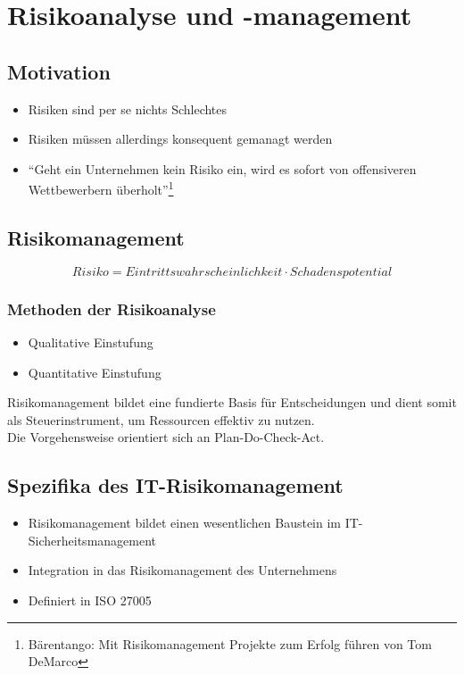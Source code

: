 \section{Risikoanalyse und -management}

\subsection{Motivation}
\begin{itemize}
	\item Risiken sind per se nichts Schlechtes
	\item Risiken müssen allerdings konsequent gemanagt werden
	\item "`Geht ein Unternehmen kein Risiko ein, wird es sofort von offensiveren Wettbewerbern überholt"'\footnote{Bärentango: Mit Risikomanagement Projekte zum Erfolg führen von Tom DeMarco}
\end{itemize}


\subsection{Risikomanagement}
\[Risiko = Eintrittswahrscheinlichkeit\cdot Schadenspotential\]

\subsubsection{Methoden der Risikoanalyse}
\begin{itemize}
	\item Qualitative Einstufung
	\item Quantitative Einstufung
\end{itemize}

Risikomanagement bildet eine fundierte Basis für Entscheidungen und dient somit als Steuerinstrument, um Ressourcen effektiv zu nutzen.\\
Die Vorgehensweise orientiert sich an Plan-Do-Check-Act.

\subsection{Spezifika des IT-Risikomanagement}
\begin{itemize}
	\item Risikomanagement bildet einen wesentlichen Baustein im IT-Sicherheitsmanagement
	\item Integration in das Risikomanagement des Unternehmens
	\item Definiert in ISO 27005
\end{itemize}


